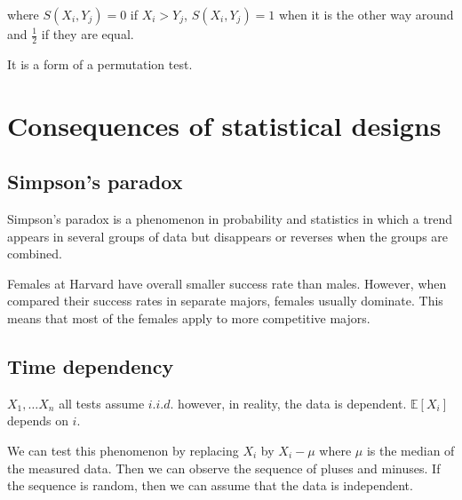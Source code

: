 where $S(X_i, Y_j) = 0$ if $X_i > Y_j$, $S(X_i, Y_j) = 1$ when it is the other way around and $\frac{1}{2}$ if they are equal.

It is a form of a permutation test.

\section{Consequences of statistical designs}

\subsection{Simpson's paradox}

Simpson's paradox is a phenomenon in probability and statistics in which a trend appears in several groups of data but disappears or reverses when the groups are combined.

\begin{example}
	Females at Harvard have overall smaller success rate than males. However, when compared their success rates in separate majors, females usually dominate. This means that most of the females apply to more competitive majors.
\end{example}

\subsection{Time dependency}

$X_1, \dots X_n$ all tests assume $i.i.d.$ however, in reality, the data is dependent. $\mathbb{E}[X_i]$ depends on $i$.

We can test this phenomenon by replacing $X_i$ by $X_i - \mu$ where $\mu$ is the median of the measured data. Then we can observe the sequence of pluses and minuses. If the sequence is random, then we can assume that the data is independent.
